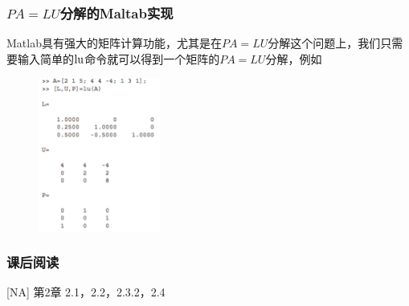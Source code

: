\documentclass[10pt]{beamer}
\begin{document}
\begin{frame}
\frametitle{$PA = LU$分解的Maltab实现}
Matlab具有强大的矩阵计算功能，尤其是在$PA = LU$分解这个问题上，我们只需要输入简单的$\rm{lu}$命令就可以得到一个矩阵的$PA = LU$分解，例如
\begin{figure}
\includegraphics[width=4cm]{figs/2_4_PA-10} 
\end{figure}
\end{frame}

\begin{frame}
\frametitle{课后阅读}
[NA] 第2章 2.1，2.2，2.3.2，2.4


\end{frame}
\end{document}
